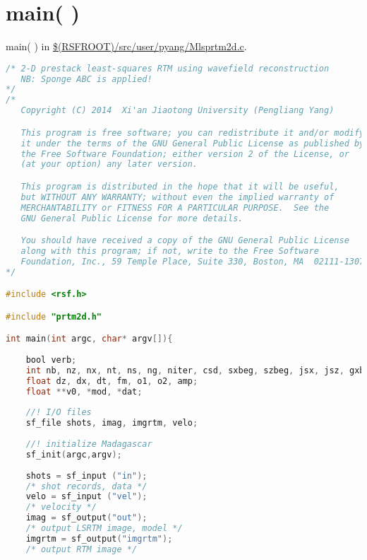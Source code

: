 \documentclass[a4paper,11pt]{article}
\theoremstyle{mytheor}
\begin{document}
\section*{main( )}
main( ) in \url{$(RSFROOT)/src/user/pyang/Mlsprtm2d.c}.
\begin{lstlisting}[label={main},language=C,tabsize=4,caption=main()]
/* 2-D prestack least-squares RTM using wavefield reconstruction
   NB: Sponge ABC is applied!
*/
/*
   Copyright (C) 2014  Xi'an Jiaotong University (Pengliang Yang)

   This program is free software; you can redistribute it and/or modify
   it under the terms of the GNU General Public License as published by
   the Free Software Foundation; either version 2 of the License, or
   (at your option) any later version.

   This program is distributed in the hope that it will be useful,
   but WITHOUT ANY WARRANTY; without even the implied warranty of
   MERCHANTABILITY or FITNESS FOR A PARTICULAR PURPOSE.  See the
   GNU General Public License for more details.

   You should have received a copy of the GNU General Public License
   along with this program; if not, write to the Free Software
   Foundation, Inc., 59 Temple Place, Suite 330, Boston, MA  02111-1307  USA
*/

#include <rsf.h>

#include "prtm2d.h"

int main(int argc, char* argv[]){   
	
	bool verb;
	int nb, nz, nx, nt, ns, ng, niter, csd, sxbeg, szbeg, jsx, jsz, gxbeg, gzbeg, jgx, jgz;
	float dz, dx, dt, fm, o1, o2, amp;
	float **v0, *mod, *dat;      
	
	//! I/O files
	sf_file shots, imag, imgrtm, velo;
	
	//! initialize Madagascar
	sf_init(argc,argv);
	
	shots = sf_input ("in");
	/* shot records, data */
	velo = sf_input ("vel"); 
	/* velocity */
	imag = sf_output("out"); 
	/* output LSRTM image, model */
	imgrtm = sf_output("imgrtm"); 
	/* output RTM image */
	

\end{lstlisting}
\end{document}
